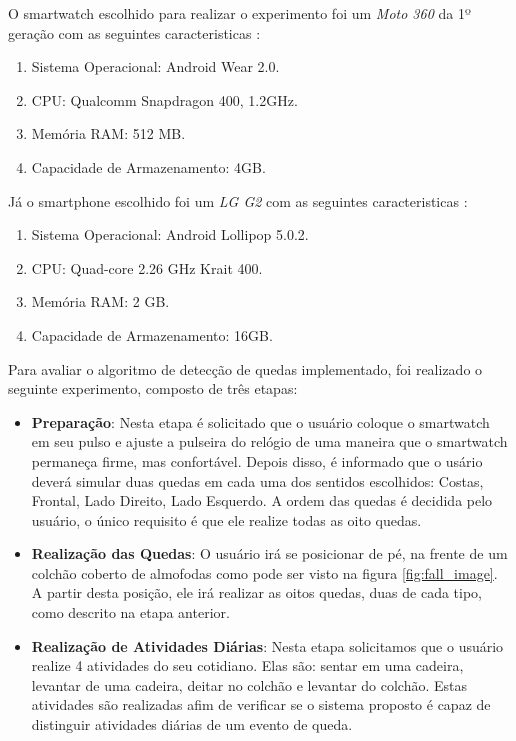  
O smartwatch escolhido para realizar o experimento foi um \textit{Moto 360} da 1º geração com as seguintes caracteristicas \citep{moto360}:

	\begin{enumerate}
		\item Sistema Operacional: Android Wear 2.0.
		\item CPU: Qualcomm Snapdragon 400, 1.2GHz.
		\item Memória RAM: 512 MB.
		\item Capacidade de Armazenamento: 4GB.
	\end{enumerate}
	
Já o smartphone escolhido foi um \textit{LG G2} com as seguintes caracteristicas \citep{lg_g2}:

	\begin{enumerate}
		\item Sistema Operacional: Android  Lollipop 5.0.2.
		\item CPU: Quad-core 2.26 GHz Krait 400.
		\item Memória RAM: 2 GB.
		\item Capacidade de Armazenamento: 16GB.
	\end{enumerate}


Para avaliar o algoritmo de detecção de quedas implementado, foi realizado o seguinte experimento, composto de três etapas:

\begin{itemize}
	\item{\textbf{Preparação}: Nesta etapa é solicitado que o usuário coloque o smartwatch em seu pulso e ajuste a pulseira do relógio de uma maneira que o smartwatch permaneça firme, mas confortável. Depois disso, é informado que o usário deverá simular duas quedas em cada uma dos sentidos escolhidos: Costas, Frontal, Lado Direito, Lado Esquerdo. A ordem das quedas é decidida pelo usuário, o único requisito é que ele realize todas as oito quedas. }
	
	\item{\textbf{Realização das Quedas}: O usuário irá se posicionar de pé, na frente de um colchão coberto de almofodas como pode ser visto na figura \ref{fig:fall_image}. A partir desta posição, ele irá realizar as oitos quedas, duas de cada tipo, como descrito na etapa anterior. }
	
	\item{\textbf{Realização de Atividades Diárias}: Nesta etapa solicitamos que o usuário realize 4 atividades do seu cotidiano. Elas são: sentar em uma cadeira, levantar de uma cadeira, deitar no colchão e levantar do colchão. Estas atividades são realizadas afim de verificar se o sistema proposto é capaz de distinguir atividades diárias de um evento de queda.}
	
	
\end{itemize}


